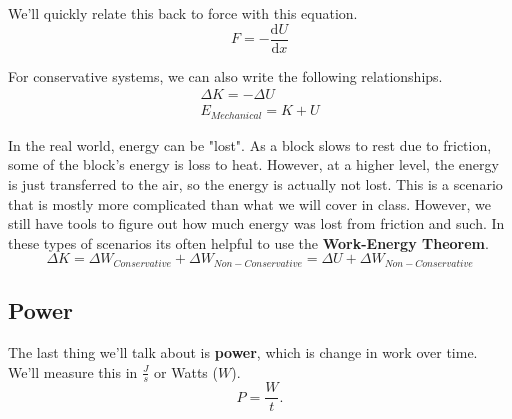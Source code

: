 We'll quickly relate this back to force with this equation.
\begin{equation}
    F = - \frac{\text{d}U}{\text{d}x}
\end{equation}

For conservative systems, we can also write the following relationships.
\begin{eqnarray}
    \Delta K = - \Delta U \\
    E_{Mechanical} = K + U
\end{eqnarray}

In the real world, energy can be "lost". As a block slows to rest due to friction, some of the block's energy is loss to heat. However, at a higher 
level, the energy is just transferred to the air, so the energy is actually not lost. This is a scenario that is mostly more complicated than what we 
will cover in class. However, we still have tools to figure out how much energy was lost from friction and such. In these types of scenarios its often
helpful to use the \textbf{Work-Energy Theorem}. 
\begin{equation}
    \Delta K = \Delta W_{Conservative} + \Delta W_{Non-Conservative} = \Delta U + \Delta W_{Non-Conservative}
\end{equation}

\subsection{Power}
The last thing we'll talk about is \textbf{power}, which is change in work over time. We'll measure this in $\frac{J}{s}$ or Watts ($W$).
\begin{equation}
    P = \frac{W}{t}.
\end{equation}
